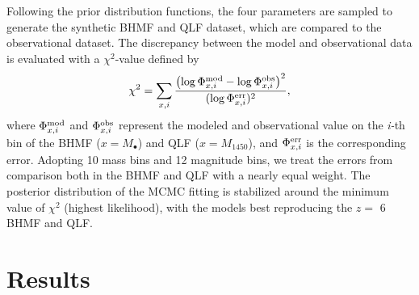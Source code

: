 \documentclass[twocolumn, twocolappendix]{aastex63}
\newcommand{\Mbh}{M_\bullet}
\newcommand{\Muv}{M_{1450}}
\begin{document}
\begin{CJK*}{UTF8}{gbsn}
  

Following the prior distribution functions, the four parameters are sampled to generate the synthetic 
BHMF and QLF dataset, which are compared to the observational dataset. 
The discrepancy between the model and observational data is evaluated with a $\chi^2$-value defined by
%
\begin{align}
  \chi^2 = \sum_{x,i}
  \frac{\left(\log{\Phi^{\rm mod}_{x,i}} - \log{\Phi^{\rm obs}_{x,i}}\right)^2}{(\log{\Phi^{\rm err}_{x,i}})^2},
\end{align}
%
where $\Phi^{\rm mod}_{x,i}$ and $\Phi^{\rm obs}_{x,i}$ represent the modeled and observational value 
on the \textit{i-}th bin of the BHMF ($x=\Mbh$) and QLF ($x=\Muv$), and $\Phi^{\rm err}_{x,i}$ is the corresponding error.
Adopting 10 mass bins and 12 magnitude bins, we treat the errors from comparison both in the BHMF and QLF
with a nearly equal weight.
The posterior distribution of the MCMC fitting is stabilized around the minimum value of $\chi^2$ (highest likelihood), 
with the models best reproducing the $z=$ 6 BHMF and QLF.



\vspace{2mm}
\section{Results}\label{sec:fitting_result}





\end{CJK*}
\end{document}
